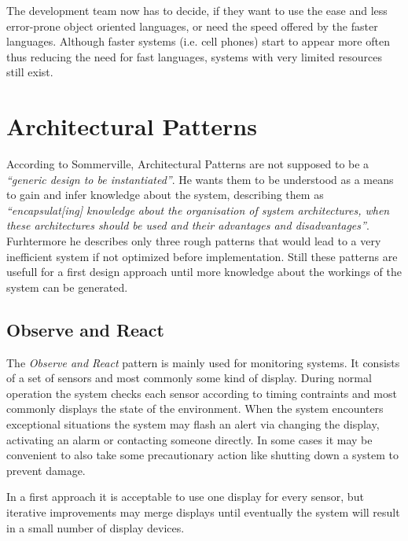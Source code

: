 \documentclass[10pt,a4paper,titlepage,draft]{article} %
\begin{document}
The development team now has to decide, if they want to use the ease and less error-prone object oriented languages, or need the speed offered by the faster languages.
Although faster systems (i.e. cell phones) start to appear more often thus reducing the need for fast languages, systems with very limited resources still exist.


\section{Architectural Patterns}
According to Sommerville, Architectural Patterns are not supposed to be a \textit{``generic design to be instantiated''\cite[p. 547]{sommerville}}.
He wants them to be understood as a means to gain and infer knowledge about the system, describing them as \textit{``encapsulat[ing] knowledge about the organisation of system architectures, when these architectures should be used and their advantages and disadvantages''\cite[p.547]{sommerville}}.
Furhtermore he describes only three rough patterns that would lead to a very inefficient system if not optimized before implementation.
Still these patterns are usefull for a first design approach until more knowledge about the workings of the system can be generated.

\subsection{Observe and React}
The \emph{Observe and React} pattern is mainly used for monitoring systems.
It consists of a set of sensors and most commonly some kind of display.
During normal operation the system checks each sensor according to timing contraints and most commonly displays the state of the environment.
When the system encounters exceptional situations the system may flash an alert via changing the display, activating an alarm or contacting someone directly.
In some cases it may be convenient to also take some precautionary action like shutting down a system to prevent damage.

In a first approach it is acceptable to use one display for every sensor, but iterative improvements may merge displays until eventually the system will result in a small number of display devices.
\end{document}
